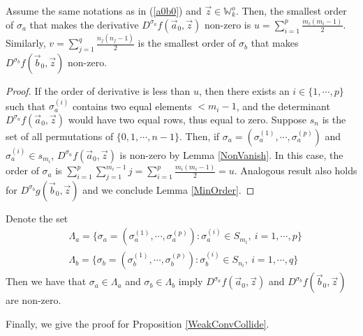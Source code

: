 \begin{lemma}{\label{MinOrder}}
Assume the same notations as in (\ref{a0b0}) and $\vec{z}\in\mathbb{W}_{k}^{o}$. Then, the smallest order of $\sigma_{a}$ that makes the derivative $D^{\sigma_{a}}f(\vec{a}_{0},\vec{z})$ non-zero is $u=\sum_{i=1}^{p}\frac{m_{i}(m_{i}-1)}{2}$. Similarly, $v=\sum_{j=1}^{q}\frac{n_{j}(n_{j}-1)}{2}$ is the smallest order of $\sigma_{b}$ that makes $D^{\sigma_{b}}f(\vec{b}_{0},\vec{z})$ non-zero.
\end{lemma}
\begin{proof}
	If the order of derivative is less than $u$, then there exists an $i\in\{1,\cdots,p\}$ such that $\sigma_{a}^{(i)}$ contains two equal elements $<m_i-1$, and the determinant $D^{\sigma_{a}}f(\vec{a}_{0},\vec{z})$ would have two equal rows, thus equal to zero. Suppose $s_{n}$ is the set of all permutations of $\{0,1,\cdots,n-1\}$. Then, if $\sigma_{a}=\left(\sigma^{(1)}_a,\cdots,\sigma^{(p)}_a\right)$ and $\sigma^{(i)}_a\in s_{m_i}$, $D^{\sigma_{a}}f(\vec{a}_{0},\vec{z})$ is non-zero by Lemma \ref{NonVanish}. In this case, the order of $\sigma_{a}$ is $\sum_{i=1}^{p}\sum_{j=1}^{m_i-1}j=\sum_{i=1}^{p}\frac{m_i(m_i-1)}{2}=u$. Analogous result also holds for $D^{\sigma_b}g(\vec{b}_0,\vec{z})$ and we conclude Lemma \ref{MinOrder}.
	\end{proof}
\begin{remark}{\label{Lambdaa}}
	Denote the set 
	\begin{equation}
	\begin{split}
		& \Lambda_{a}=\{\sigma_{a}=\left(\sigma_{a}^{(1)},\cdots,\sigma_{a}^{(p)}\right):\sigma_{a}^{(i)}\in S_{m_i},\ i=1,\cdots, p\}\\
		& \Lambda_{b}=\{\sigma_{b}=\left(\sigma_{b}^{(1)},\cdots,\sigma_{b}^{(p)}\right):\sigma_{b}^{(i)}\in S_{n_i},\ i=1,\cdots, q\}
	\end{split}
	\end{equation}
	Then we have that $\sigma_{a}\in\Lambda_a$ and $\sigma_{b}\in\Lambda_b$ imply $D^{\sigma_a}f(\vec{a}_0,\vec{z})$ and $D^{\sigma_b}f(\vec{b}_0,\vec{z})$ are non-zero.
\end{remark}
Finally, we give the proof for Proposition \ref{WeakConvCollide}. 
